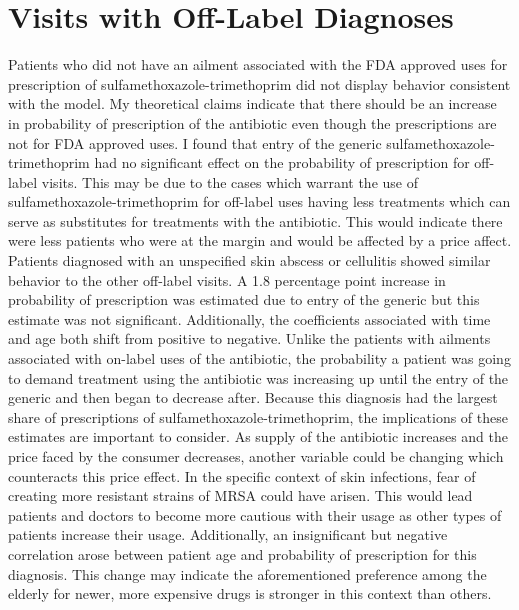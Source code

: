 \section{Visits with Off-Label Diagnoses}
\indent Patients who did not have an ailment associated with the FDA approved uses for prescription of sulfamethoxazole-trimethoprim did not display behavior consistent with the model. My theoretical claims indicate that there should be an increase in probability of prescription of the antibiotic even though the prescriptions are not for FDA approved uses. I found that entry of the generic sulfamethoxazole-trimethoprim had no significant effect on the probability of prescription for off-label visits. This may be due to the cases which warrant the use of sulfamethoxazole-trimethoprim for off-label uses having less treatments which can serve as substitutes for treatments with the antibiotic. This would indicate there were less patients who were at the margin and would be affected by a price affect.\\
\indent Patients diagnosed with an unspecified skin abscess or cellulitis showed similar behavior to the other off-label visits. A 1.8 percentage point increase in probability of prescription was estimated due to entry of the generic but this estimate was not significant. Additionally, the coefficients associated with time and age both shift from positive to negative. Unlike the patients with ailments associated with on-label uses of the antibiotic, the probability a patient was going to demand treatment using the antibiotic was increasing up until the entry of the generic and then began to decrease after. Because this diagnosis had the largest share of prescriptions of sulfamethoxazole-trimethoprim, the implications of these estimates are important to consider. As supply of the antibiotic increases and the price faced by the consumer decreases, another variable could be changing which counteracts this price effect. In the specific context of skin infections, fear of creating more resistant strains of MRSA could have arisen. This would lead patients and doctors to become more cautious with their usage as other types of patients increase their usage. Additionally, an insignificant but negative correlation arose between patient age and probability of prescription for this diagnosis. This change may indicate the aforementioned preference among the elderly for newer, more expensive drugs \cite{kianmehr_system_2020} is stronger in this context than others.